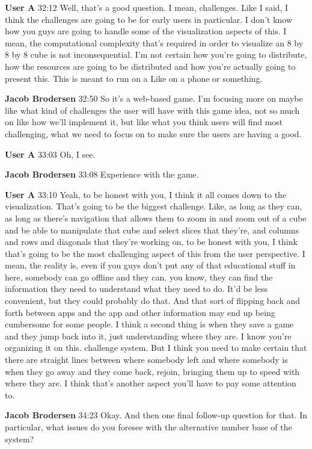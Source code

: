 \documentclass{article}
\begin{document}
\noindent \textbf{User A}   32:12
Well, that's a good question. I mean, challenges. Like I said, I think the challenges are going to be for early users in particular. I don't know how you guys are going to handle some of the visualization aspects of this.
I mean, the computational complexity that's required in order to visualize an 8 by 8 by 8 cube is not inconsequential. I'm not certain how you're going to distribute, how the resources are going to be distributed and how you're actually going to present this. This is meant to run on a
Like on a phone or something.

\noindent \textbf{Jacob Brodersen}   32:50
So it's a web-based game. I'm focusing more on maybe like what kind of challenges the user will have with this game idea, not so much on like how we'll implement it, but like what you think users will find most challenging, what we need to focus on to make sure the users are having a good.

\noindent \textbf{User A}   33:03
Oh, I see.

\noindent \textbf{Jacob Brodersen}   33:08
Experience with the game.

\noindent \textbf{User A}   33:10
Yeah, to be honest with you, I think it all comes down to the visualization. That's going to be the biggest challenge. Like, as long as they can, as long as there's navigation that allows them to zoom in and zoom out of a cube and be able to manipulate that cube and select slices that they're, and columns and rows and diagonals that they're working on, to be honest with you, I think that's going to be
the most challenging aspect of this from the user perspective. I mean, the reality is, even if you guys don't put any of that educational stuff in here, somebody can go offline and they can.
you know, they can find the information they need to understand what they need to do. It'd be less convenient, but they could probably do that. And that sort of flipping back and forth between apps and the app and other information may end up being cumbersome for some people. I think a second thing is when they save a game and they jump back into it, just understanding where they are. I know you're organizing it on this.
challenge system. But I think you need to make certain that there are straight lines between where somebody left and where somebody is when they go away and they come back, rejoin, bringing them up to speed with where they are. I think that's another aspect you'll have to pay some attention to.

\noindent \textbf{Jacob Brodersen}   34:23
Okay.
And then one final follow-up question for that. In particular, what issues do you foresee with the alternative number base of the system?
\end{document}
